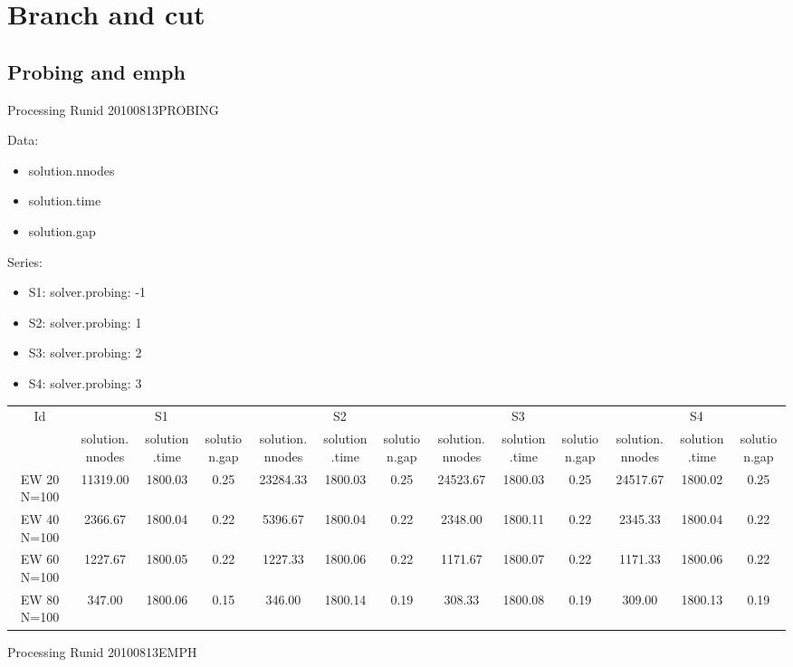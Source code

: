 \documentclass[landscape, 12pt]{report}
\begin{document}
	
	\section{Branch and cut}
	
	\subsection{Probing and emph}
	
	Processing Runid 20100813PROBING

Data:
\begin{itemize}
\item solution.nnodes
\item solution.time
\item solution.gap
\end{itemize}
Series:
\begin{itemize}
\item S1: solver.probing: -1
\item S2: solver.probing: 1
\item S3: solver.probing: 2
\item S4: solver.probing: 3
\end{itemize}
\begin{tabular}{|c|ccc|ccc|ccc|ccc|}
\hline
\multicolumn{1}{|c|}{Id} & \multicolumn{3}{|c|}{S1} & \multicolumn{3}{|c|}{S2} & \multicolumn{3}{|c|}{S3} & \multicolumn{3}{|c|}{S4}
\\
 & solution.nnodes & solution.time & solution.gap & solution.nnodes & solution.time & solution.gap & solution.nnodes & solution.time & solution.gap & solution.nnodes & solution.time & solution.gap
\\
\hline
EW 20 N=100 & 11319.00 & 1800.03 & 0.25 & 23284.33 & 1800.03 & 0.25 & 24523.67 & 1800.03 & 0.25 & 24517.67 & 1800.02 & 0.25
\\
EW 40 N=100 & 2366.67 & 1800.04 & 0.22 & 5396.67 & 1800.04 & 0.22 & 2348.00 & 1800.11 & 0.22 & 2345.33 & 1800.04 & 0.22
\\
EW 60 N=100 & 1227.67 & 1800.05 & 0.22 & 1227.33 & 1800.06 & 0.22 & 1171.67 & 1800.07 & 0.22 & 1171.33 & 1800.06 & 0.22
\\
EW 80 N=100 & 347.00 & 1800.06 & 0.15 & 346.00 & 1800.14 & 0.19 & 308.33 & 1800.08 & 0.19 & 309.00 & 1800.13 & 0.19
\\
\hline 
 \end{tabular}
 
 Processing Runid 20100813EMPH
\end{document}
